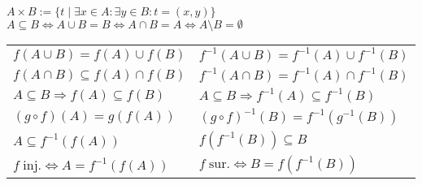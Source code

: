 \documentclass[a4paper,10pt,fleqn,twoside,twocolumn,dvipdfmx]{scrartcl}
\begin{document}
$A\times B := \{t\mid \exists x{\in}A\colon \exists y{\in}B\colon t=(x,y)\}$\\
$A\subseteq B\Leftrightarrow A\cup B=B\Leftrightarrow A\cap B=A
\Leftrightarrow A\setminus B=\emptyset$\\[2pt]
\begin{tabular}{@{}l@{\;\,}|@{\;\,}l}
$f(A\cup B) = f(A)\cup f(B)$ & $f^{-1}(A\cup B) = f^{-1}(A)\cup f^{-1}(B)$\\
$f(A\cap B) \subseteq f(A)\cap f(B)$ & $f^{-1}(A\cap B) = f^{-1}(A)\cap f^{-1}(B)$\\
$A\subseteq B\Rightarrow f(A)\subseteq f(B)$ & $A\subseteq B\Rightarrow f^{-1}(A)\subseteq f^{-1}(B)$\\
$(g\circ f)(A) = g(f(A))$ & $(g\circ f)^{-1}(B) = f^{-1}(g^{-1}(B))$\\
$A\subseteq f^{-1}(f(A))$ & $f(f^{-1}(B))\subseteq B$\\
$f\;\text{inj.}\Leftrightarrow A = f^{-1}(f(A))$
& $f\;\text{sur.}\Leftrightarrow B = f(f^{-1}(B))$
\end{tabular}

\newpage
\end{document}
